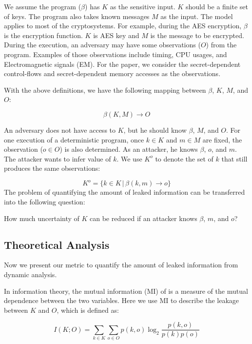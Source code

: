 We assume the program ($\beta$) has $K$ as the sensitive input. 
$K$ should be a finite set of keys. The program also takes known messages $M$ as the input. 
The model applies to most of the cryptosystems. For example,
during the AES encryption, $\beta$ is the encryption function. $K$ is AES key and
$M$ is the message to be encrypted. During the execution, an adversary may have some observations ($O$) from the program. Examples of those observations
include timing, CPU usages, and Electromagnetic signals (EM). For the paper, we
consider the secret-dependent control-flows and secret-dependent memory accesses
as the observations.

With the above definitions, we have the following mapping between $\beta$, $K$, $M$, and $O$:

\begin{displaymath}
    \beta(K, M) \rightarrow	O
\end{displaymath}

An adversary does not have access to $K$, but he should know $\beta$, $M$, and $O$. 
For one execution of a deterministic program, once $k \in K$ and $m \in M$ are fixed, the 
observation ($o \in O$) is also determined. As an attacker, he knows $\beta$, $o$, 
and $m$. The attacker wants to infer value of $k$. We use $K^o$ to denote the set of
$k$ that still produces the same observations:

\begin{displaymath}
    K^o = \{ k \in K \, |\, \beta(k, m) \rightarrow o\}
\end{displaymath}
The problem of quantifying the amount of leaked information can be transferred into the
following question: 

How much uncertainty of $K$ can be reduced if an attacker knows $\beta$, $m$, and $o$?  
 
\subsection{Theoretical Analysis}
Now we present our metric to quantify the amount of leaked 
information from dynamic analysis.

In information theory, the mutual information (MI) of is a measure of the mutual dependence 
between the two variables. Here we use MI to describe the leakage between $K$ and $O$, 
which is defined as:

\begin{equation} \label{eq:1}
    I(K;O) = \sum_{k {\in} K}{\sum_{o {\in} O}{p(k, o)\log_2\frac{p(k, o)}{p(k)p(o)}}}
\end{equation}

